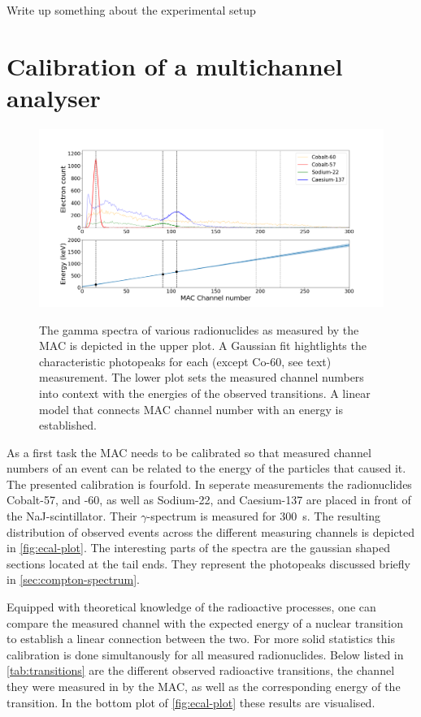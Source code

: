 
\todo Write up something about the experimental setup

\section{Calibration of a multichannel analyser}
\label{sec:ecal}

\begin{figure}
	\label{fig:ecal-plot}
	\includegraphics[width=1.0\textwidth]{./fig/ecal-plot.png}
	\caption{}{The gamma spectra of various radionuclides as measured by the MAC 
	is depicted in the upper plot. A Gaussian fit hightlights the characteristic
	photopeaks for each (except Co-60, see text) measurement. The lower plot 
	sets the measured channel numbers into context with the energies of the
	observed transitions. A linear model that connects MAC channel number with an
	energy is established.}
\end{figure}

As a first task the MAC needs to be calibrated so that measured channel numbers of an
event can be related to the energy of the particles that caused it. The presented 
calibration is fourfold. In seperate measurements the radionuclides Cobalt-57, and 
-60, as well as Sodium-22, and Caesium-137 are placed in front of the 
NaJ-scintillator. Their $\gamma$-spectrum is measured for \SI{300}{\second}. The 
resulting distribution of observed events across the different measuring channels is 
depicted in \autoref{fig:ecal-plot}. The interesting parts of the spectra are the 
gaussian shaped sections located at the tail ends. They represent the photopeaks 
discussed briefly in \autoref{sec:compton-spectrum}.

Equipped with theoretical knowledge of the radioactive processes, one can compare the
measured channel with the expected energy of a nuclear transition to establish a
linear connection between the two. For more solid statistics this calibration is done
simultanously for all measured radionuclides. Below listed in
\autoref{tab:transitions} are the different observed radioactive transitions, the 
channel they were measured in by the MAC, as well as the corresponding energy of the 
transition. In the bottom plot of \autoref{fig:ecal-plot} these results are
visualised.


